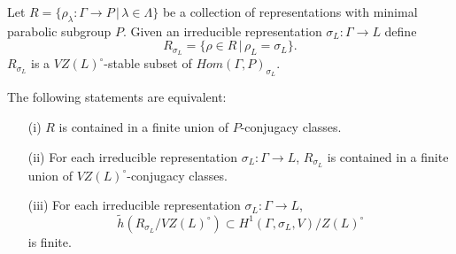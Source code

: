 \begin{lemma}
  Let $R = \{\rho_\lambda:\Gamma\rightarrow P\,|\,\lambda\in\Lambda\}$ be a collection of representations with minimal parabolic subgroup $P$. Given an irreducible representation $\sigma_L:\Gamma\rightarrow L$ define
  \begin{displaymath}
    R_{\sigma_L} = \{\rho \in R\,|\,\rho_L = \sigma_L\}. 
  \end{displaymath}
  $R_{\sigma_L}$ is a $VZ(L)^\circ$-stable subset of $Hom(\Gamma, P)_{\sigma_L}$.
  
  The following statements are equivalent:
  \begin{itemize}
    \item[(i)] $R$ is contained in a finite union of $P$-conjugacy classes.
    \item[(ii)] For each irreducible representation $\sigma_L:\Gamma\rightarrow L$, $R_{\sigma_L}$ is contained in a finite union of $VZ(L)^\circ$-conjugacy classes.
    \item[(iii)] For each irreducible representation $\sigma_L:\Gamma\rightarrow L$,
      \begin{displaymath}
	\tilde{h}(R_{\sigma_L}/VZ(L)^\circ) \subset H^{1}(\Gamma,\sigma_L,V)/Z(L)^\circ
      \end{displaymath}
      is finite.
  \end{itemize}
  \label{lem:p_h1}
\end{lemma}
